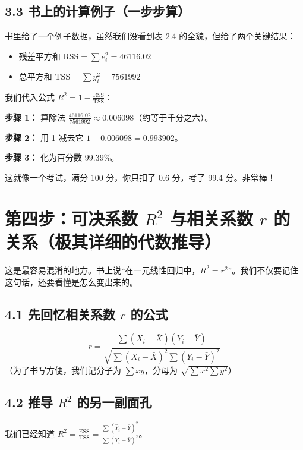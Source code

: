 \documentclass[12pt,a4paper]{article}
\begin{document}
\subsection*{3.3 书上的计算例子（一步步算）}

书里给了一个例子数据，虽然我们没看到表 2.4 的全貌，但给了两个关键结果：
\begin{itemize}[itemsep=0pt,topsep=0pt]
    \item 残差平方和 \(\mathrm{RSS} = \sum e_i^2 = 46116.02\)
    \item 总平方和 \(\mathrm{TSS} = \sum y_i^2 = 7561992\)
\end{itemize}

我们代入公式 \(R^2 = 1 - \frac{\mathrm{RSS}}{\mathrm{TSS}}\)：

\textbf{步骤 1：} 算除法 \(\frac{46116.02}{7561992} \approx 0.006098\)（约等于千分之六）。

\textbf{步骤 2：} 用 1 减去它 \(1 - 0.006098 = 0.993902\)。

\textbf{步骤 3：} 化为百分数 \(99.39\%\)。

这就像一个考试，满分 100 分，你只扣了 0.6 分，考了 99.4 分。非常棒！

\section*{第四步：可决系数 \(R^2\) 与相关系数 \(r\) 的关系（极其详细的代数推导）}

这是最容易混淆的地方。书上说“在一元线性回归中，\(R^2 = r^2\)”。我们不仅要记住这句话，还要看懂是怎么变出来的。

\subsection*{4.1 先回忆相关系数 \(r\) 的公式}

\begin{equation}
    r = \frac{\sum (X_i - \bar{X})(Y_i - \bar{Y})}{\sqrt{\sum (X_i - \bar{X})^2 \sum (Y_i - \bar{Y})^2}}
\end{equation}
（为了书写方便，我们记分子为 \(\sum xy\)，分母为 \(\sqrt{\sum x^2 \sum y^2}\)）

\subsection*{4.2 推导 \(R^2\) 的另一副面孔}

我们已经知道 \(R^2 = \frac{\mathrm{ESS}}{\mathrm{TSS}} = \frac{\sum (\hat{Y}_i - \bar{Y})^2}{\sum (Y_i - \bar{Y})^2}\)。
\end{document}
